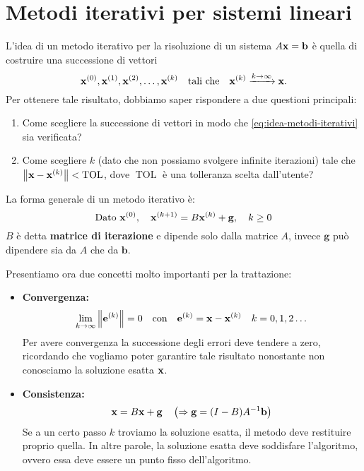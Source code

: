 \chapter{Metodi iterativi per sistemi lineari}


L'idea di un metodo iterativo per la risoluzione di un sistema $A\mathbf{x} =\mathbf{b}$ è quella di costruire una successione di vettori
\begin{equation}
\mathbf{x}^{(0)} ,\mathbf{x}^{(1)} ,\mathbf{x}^{(2)} ,\dotsc ,\mathbf{x}^{(k)} \quad \text{tali che} \quad \mathbf{x}^{(k)}\xrightarrow{k\rightarrow \infty }\mathbf{x}.
\label{eq:idea-metodi-iterativi}
\end{equation}
Per ottenere tale risultato, dobbiamo saper rispondere a due questioni principali:
\begin{enumerate}
\item Come scegliere la successione di vettori in modo che \eqref{eq:idea-metodi-iterativi} sia verificata?
\item Come scegliere $k$ (dato che non possiamo svolgere infinite iterazioni) tale che $\left\Vert \mathbf{x} -\mathbf{x}^{(k)}\right\Vert < \operatorname{TOL}$, dove $\operatorname{TOL}$ è una tolleranza scelta dall'utente?
\end{enumerate}

La forma generale di un metodo iterativo è:
\begin{equation}
\text{Dato} \ \mathbf{x}^{(0)} ,\quad \mathbf{x}^{( k+1)} =B\mathbf{x}^{(k)} +\mathbf{g} ,\quad k \geq 0
\label{eq:forma-generale-metodo-iterativo}
\end{equation}
$B$ è detta \textbf{matrice di iterazione} e dipende solo dalla matrice $A$, invece $\mathbf{g}$ può dipendere sia da $A$ che da $\mathbf{b}$.

Presentiamo ora due concetti molto importanti per la trattazione:
\begin{itemize}
\item \textbf{Convergenza:}
\begin{equation*}
\lim _{k\rightarrow \infty }\left\Vert \mathbf{e}^{(k)}\right\Vert = 0 \quad \text{con} \quad \mathbf{e}^{(k)} =\mathbf{x} -\mathbf{x}^{(k)} \quad k=0,1,2\dotsc
\end{equation*}
Per avere convergenza la successione degli errori deve tendere a zero, ricordando che vogliamo poter garantire tale risultato nonostante non conosciamo la soluzione esatta $\mathbf{x}$.
\item \textbf{Consistenza:}
\begin{equation*}
\mathbf{x} =B\mathbf{x} +\mathbf{g} \quad \left( \Rightarrow \mathbf{g} =( I-B) A^{-1}\mathbf{b}\right)
\end{equation*}
Se a un certo passo $k$ troviamo la soluzione esatta, il metodo deve restituire proprio quella.
In altre parole, la soluzione esatta deve soddisfare l'algoritmo, ovvero essa deve essere un punto fisso dell'algoritmo.
\end{itemize}

